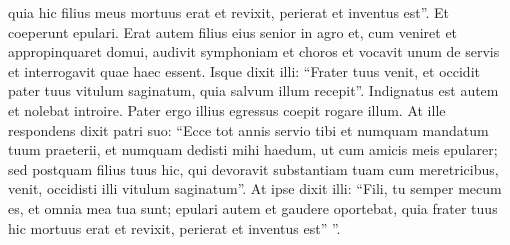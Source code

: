 \begin{biblechapter}
\begin{biblechapter}
\begin{biblechapter}
\begin{biblechapter}
\begin{biblechapter}
\begin{biblechapter}
\begin{biblechapter}
\begin{biblechapter}
\begin{biblechapter}
\begin{biblechapter}
\begin{biblechapter}
\begin{biblechapter}
\begin{biblechapter}
\begin{biblechapter}
\begin{biblechapter}
\verse quia hic filius meus mortuus erat et revixit, perierat et inventus est”. Et coeperunt epulari.
 \verse Erat autem filius eius senior in agro et, cum veniret et appropinquaret domui, audivit symphoniam et choros 
\verse et vocavit unum de servis et interrogavit quae haec essent. 
\verse Isque dixit illi: “Frater tuus venit, et occidit pater tuus vitulum saginatum, quia salvum illum recepit”. 
\verse Indignatus est autem et nolebat introire. Pater ergo illius egressus coepit rogare illum. 
\verse At ille respondens dixit patri suo: “Ecce tot annis servio tibi et numquam mandatum tuum praeterii, et numquam dedisti mihi haedum, ut cum amicis meis epularer; 
\verse sed postquam filius tuus hic, qui devoravit substantiam tuam cum meretricibus, venit, occidisti illi vitulum saginatum”.
 \verse At ipse dixit illi: “Fili, tu semper mecum es, et omnia mea tua sunt; 
\verse epulari autem et gaudere oportebat, quia frater tuus hic mortuus erat et revixit, perierat et inventus est” ”.
 

\end{biblechapter}
\end{biblechapter}
\end{biblechapter}
\end{biblechapter}
\end{biblechapter}
\end{biblechapter}
\end{biblechapter}
\end{biblechapter}
\end{biblechapter}
\end{biblechapter}
\end{biblechapter}
\end{biblechapter}
\end{biblechapter}
\end{biblechapter}
\end{biblechapter}
